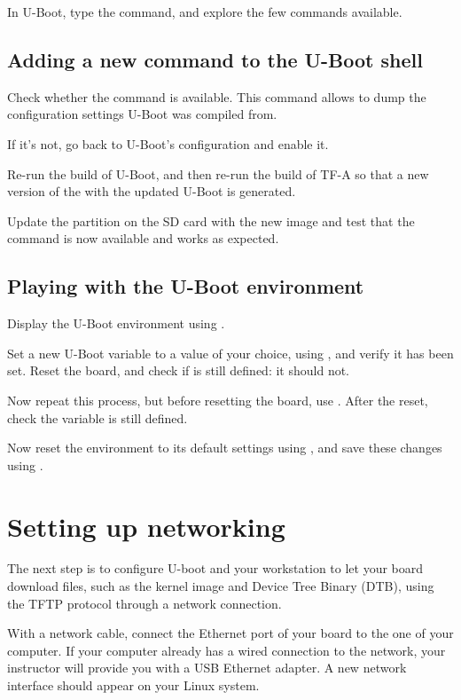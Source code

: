 In U-Boot, type the  command, and explore the few commands
available.

\subsection{Adding a new command to the U-Boot shell}

Check whether the  command is available. This command
allows to dump the configuration settings U-Boot was compiled from.

If it's not, go back to U-Boot's configuration and enable it.

Re-run the build of U-Boot, and then re-run the build of TF-A so that
a new version of the  with the updated U-Boot is
generated.

Update the  partition on the SD card with the new
 image and test that the command is now available and
works as expected.

\subsection{Playing with the U-Boot environment}

Display the U-Boot environment using .

Set a new U-Boot variable  to a value of your choice, using
, and verify it has been set. Reset the board, and check
if  is still defined: it should not.

Now repeat this process, but before resetting the board, use
. After the reset, check the  variable is
still defined.

Now reset the environment to its default settings using , and save these changes using .

\section{Setting up networking}

The next step is to configure U-boot and your workstation to let your
board download files, such as the kernel image and Device Tree Binary
(DTB), using the TFTP protocol through a network connection.

With a network cable, connect the Ethernet port of
your board to the one of your computer. If your computer already has a
wired connection to the network, your instructor will provide you with
a USB Ethernet adapter. A new network interface should appear on your
Linux system.

